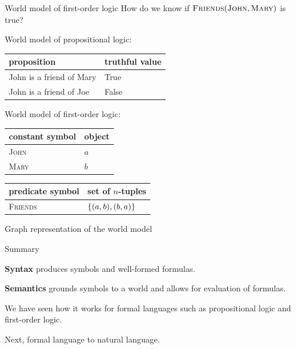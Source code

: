 \documentclass[usenames,dvipsnames,notes,11pt,aspectratio=169]{beamer}
\begin{document}
\begin{frame}
    {World model of first-order logic}
    How do we know if $\textsc{Friends}(\textsc{John}, \textsc{Mary})$ is true?

    World model of propositional logic: \\
    \begin{table}
        \begin{tabular}{ll}
            proposition & truthful value \\
            \midrule
            John is a friend of Mary & True\\
            John is a friend of Joe & False
        \end{tabular}
    \end{table}

    World model of first-order logic: \\
    \begin{table}
        \begin{tabular}{ll}
            constant symbol & object \\
            \midrule
            \textsc{John} & $a$ \\
             \textsc{Mary} & $b$ \\
        \end{tabular}
    \end{table}
    \vspace{-1.5em}
    \begin{table}
        \begin{tabular}{ll}
            predicate symbol & set of $n$-tuples \\
            \midrule
            \textsc{Friends} & $\left\{ (a,b), (b,a) \right\}$ \\
        \end{tabular}
    \end{table}
\end{frame}

\begin{frame}
    {Graph representation of the world model}
\end{frame}

\begin{frame}
    {Summary}

    \textbf{Syntax} produces symbols and well-formed formulas.

    \textbf{Semantics} grounds symbols to a world and allows for evaluation of formulas.

    We have seen how it works for formal languages such as propositional logic and first-order logic.

    Next, formal language to natural language.
\end{frame}
\end{document}
